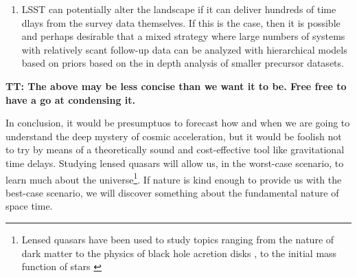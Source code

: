 \begin{enumerate}
\item LSST can potentially alter the landscape if it can deliver hundreds of time dlays from the survey data themselves. If this is the case, then it is possible and perhaps desirable that a mixed strategy where large numbers of systems with relatively scant follow-up data can be analyzed with hierarchical models based on priors based on the in depth analysis of smaller precursor datasets.
\end{enumerate}

\textbf{TT: The above may be less concise than we want it to be. Free free to have a go at condensing it.}

In conclusion, it would be presumptuos to forecast how and when we are
going to understand the deep mystery of cosmic acceleration, but it
would be foolish not to try by means of a theoretically sound and
cost-effective tool like gravitational time delays. Studying lensed
quasars will allow us, in the worst-case scenario, to learn much about
the universe\footnote{Lensed quasars have been used to study topics ranging from the nature of dark matter
\citep{Metcalf:2005p1203,Xu++09,Veg++14,Nie++14} to the physics of
black hole acretion disks \citep{PMK08,Blackburne:2010p6600}, to the
initial mass function of stars \citep{Sch++14}}. If nature is kind
enough to provide us with the best-case scenario, we will discover
something about the fundamental nature of space time.

